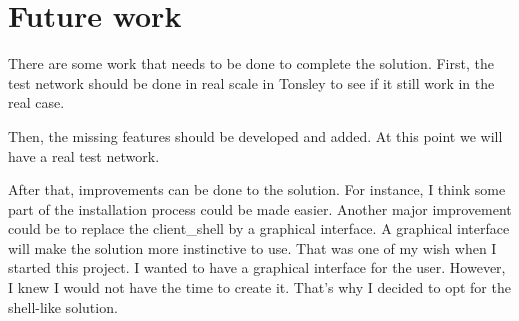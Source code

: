 \chapter{Future work}

There are some work that needs to be done to complete the solution.
First, the test network should be done in real scale in Tonsley to see if it still work in the real case.

Then, the missing features should be developed and added. 
At this point we will have a real test network.

After that, improvements can be done to the solution. For instance, I think some part of the installation process could be made easier.
Another major improvement could be to replace the client\_shell by a graphical interface. A graphical interface will make the solution more instinctive to use. That was one of my wish when I started this project. I wanted to have a graphical interface for the user. However, I knew I would not have the time to create it. That's why I decided to opt for the shell-like solution.
